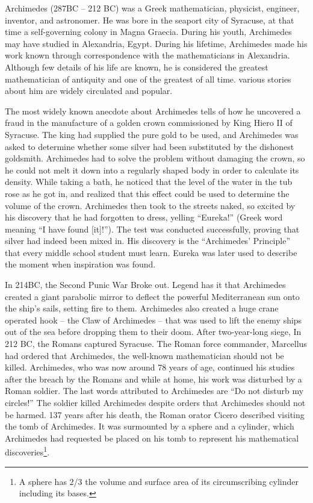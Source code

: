 \documentclass{article}
\begin{document}
Archimedes (287BC -- 212 BC) was a Greek mathematician, physicist, engineer, inventor, and astronomer. He was bore in the seaport city of Syracuse, at that time a self-governing colony in Magna Graecia. During his youth, Archimedes may have studied in Alexandria, Egypt. During his lifetime, Archimedes made his work known through correspondence with the mathematicians in Alexandria. Although few details of his life are known, he is considered the greatest mathematician of antiquity and one of the greatest of all time. various stories about him are widely circulated and popular.

The most widely known anecdote about Archimedes tells of how he uncovered a fraud in the manufacture of a golden crown commissioned by King Hiero II of Syracuse. The king had supplied the pure gold to be used, and Archimedes was asked to determine whether some silver had been substituted by the dishonest goldsmith. Archimedes had to solve the problem without damaging the crown, so he could not melt it down into a regularly shaped body in order to calculate its density. While taking a bath, he noticed that the level of the water in the tub rose as he got in, and realized that this effect could be used to determine the volume of the crown. Archimedes then took to the streets naked, so excited by his discovery that he had forgotten to dress, yelling ``Eureka!'' (Greek word meaning ``I have found [it]!''). The test was conducted successfully, proving that silver had indeed been mixed in. His discovery is the ``Archimedes' Principle'' that every middle school student must learn. Eureka was later used to describe the moment when inspiration was found.

In 214BC, the Second Punic War Broke out. Legend has it that Archimedes created a giant parabolic mirror to deflect the powerful Mediterranean sun onto the ship's sails, setting fire to them. Archimedes also created a huge crane operated hook – the Claw of Archimedes – that was used to lift the enemy ships out of the sea before dropping them to their doom. After two-year-long siege, In 212 BC, the Romans captured Syracuse. The Roman force commander, Marcellus had ordered that Archimedes, the well-known mathematician should not be killed. Archimedes, who was now around 78 years of age, continued his studies after the breach by the Romans and while at home, his work was disturbed by a Roman soldier. The last words attributed to Archimedes are ``Do not disturb my circles!'' The soldier killed Archimedes despite orders that Archimedes should not be harmed. 137 years after his death, the Roman orator Cicero described visiting the tomb of Archimedes. It was surmounted by a sphere and a cylinder, which Archimedes had requested be placed on his tomb to represent his mathematical discoveries\footnote{A sphere has 2/3 the volume and surface area of its circumscribing cylinder including its bases.}.
\end{document}
